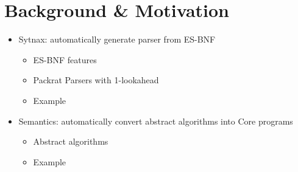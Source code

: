 \section{Background \& Motivation}

\begin{itemize}
  \item Sytnax: automatically generate parser from ES-BNF
    \begin{itemize}
      \item ES-BNF features
      \item Packrat Parsers with 1-lookahead
      \item Example
    \end{itemize}
  \item Semantics: automatically convert abstract algorithms into Core programs
    \begin{itemize}
      \item Abstract algorithms
      \item Example
    \end{itemize}
\end{itemize}
